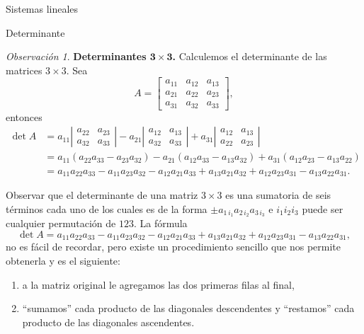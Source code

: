 \documentclass[a4paper,12pt,twoside,spanish]{amsbook}
\theoremstyle{definition}
\theoremstyle{remark}
\newtheorem{observacion}{Observaci\'on}[section]
\begin{document}
\begin{chapter}{Sistemas lineales}
\begin{section}{Determinante}
	
	\begin{observacion} \textbf{Determinantes $\mathbf{3 \times 3}$.} Calculemos el determinante de las matrices $3 \times 3$. Sea 
		$$A=\begin{bmatrix}a_{11}&a_{12}&a_{13}\\a_{21}&a_{22}&a_{23}\\a_{31}&a_{32}&a_{33}\end{bmatrix},$$  entonces
		\begin{align*}
		\det A &= a_{11}\left|\begin{matrix}a_{22}&a_{23}\\a_{32}&a_{33}\end{matrix}\right|
		- a_{21}\left|\begin{matrix}a_{12}&a_{13}\\a_{32}&a_{33}\end{matrix}\right|
		+ a_{31}\left|\begin{matrix}a_{12}&a_{13}\\a_{22}&a_{23}\end{matrix}\right|\\
		&= a_{11}(a_{22}a_{33}- a_{23}a_{32})
		- a_{21}(a_{12}a_{33}-a_{13}a_{32}) 
		+ a_{31}(a_{12}a_{23} - a_{13}a_{22}) \\
		&=a_{11}a_{22}a_{33}- a_{11}a_{23}a_{32} 
		- a_{12}a_{21}a_{33}+ a_{13}a_{21}a_{32}+ a_{12}a_{23}a_{31}
		- a_{13}a_{22}a_{31}.	
		\end{align*}
		
		Observar que  el determinante de una matriz $3 \times 3$ es una sumatoria de seis términos cada uno de los cuales es de la forma $\pm a_{1\,i_1}a_{2\,i_2}a_{3\,i_3}$ e $i_1i_2i_3$ puede ser cualquier permutación de $123$. La fórmula 
		\begin{equation}\label{det3x3}
		\det A =a_{11}a_{22}a_{33}- a_{11}a_{23}a_{32} 
		- a_{12}a_{21}a_{33}+ a_{13}a_{21}a_{32}+ a_{12}a_{23}a_{31}
		- a_{13}a_{22}a_{31},
		\end{equation} 
		no es fácil de recordar, pero existe un procedimiento sencillo que nos permite obtenerla y es el siguiente: 
		\begin{enumerate}
			\item a la matriz original le agregamos las dos primeras filas al final, 
			\item ``sumamos''  cada producto de las diagonales descendentes y ``restamos'' cada producto de las diagonales ascendentes.
		\end{enumerate}
			

\end{observacion}
\end{section}
\end{chapter}
\end{document}

